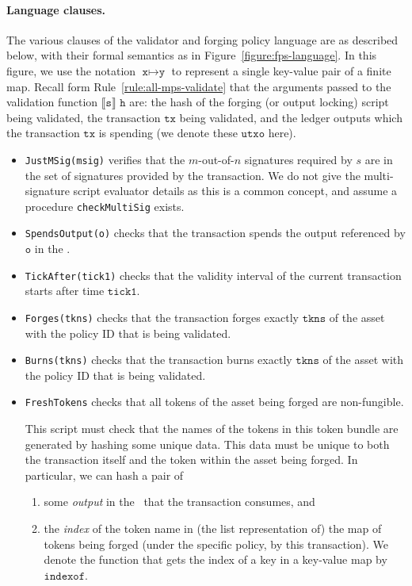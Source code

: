 \paragraph{Language clauses.}
%
The various clauses of the validator and forging policy language are as described below, with their formal semantics as in Figure~\ref{figure:fps-language}. In this figure, we use the notation
$\texttt{x}\mapsto \texttt{y}$ to represent a single key-value pair of a finite map.
Recall form Rule~\ref{rule:all-mps-validate} that the arguments passed to the validation
function $\llbracket \texttt{s} \rrbracket$ $\texttt{h}$ are: the hash of the forging (or output
locking) script being validated, the transaction $\texttt{tx}$ being validated,
and the ledger outputs which the transaction $\texttt{tx}$ is spending (we denote
these $\texttt{utxo}$ here).
%
\begin{itemize}
  \item \texttt{JustMSig(msig)}
  verifies that the $m$-out-of-$n$ signatures required by $s$ are in the
  set of signatures provided by the transaction. We do not give the
  multi-signature script evaluator details as this is a common concept, and
  assume a procedure \texttt{checkMultiSig} exists.

  \item \texttt{SpendsOutput(o)} checks that the transaction spends
  the output referenced by $\texttt{o}$ in the \UTXO.

  \item \texttt{TickAfter(tick1)} checks that the validity interval
  of the current transaction starts after time $\texttt{tick1}$.

  \item \texttt{Forges(tkns)} checks that the transaction forges exactly
  $\texttt{tkns}$ of the asset with the policy ID that is being validated.

  \item \texttt{Burns(tkns)} checks that the transaction burns exactly
  $\texttt{tkns}$ of the asset with the policy ID that is being validated.

  \item \texttt{FreshTokens}
  checks that all tokens of the asset being forged are non-fungible.

  This script must check that the names of the tokens in this token bundle
  are generated by hashing some unique data. This data must be unique to both
  the transaction itself and the token within the asset being forged.
  In particular, we can hash a pair of
  \begin{enumerate}
    \item some \emph{output} in the \UTXO\ that the
    transaction consumes, and
    \item the \emph{index} of the token name in (the
    list representation of) the map of tokens being
    forged (under the specific policy, by this transaction). We denote the
    function that gets the index of a key in a key-value map by $\texttt{indexof}$.
  \end{enumerate}


\end{itemize}
